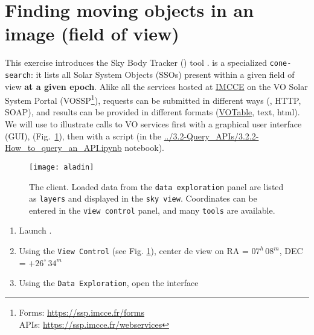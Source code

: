 \section{Finding moving objects in an image (field of view)}
\setcounter{questions}{1}


  This exercise introduces the Sky Body Tracker (\skybot) tool
  \citep{2006-ASPC-351-Berthier}.
  \skybot is a specialized \texttt{cone-search}: it lists
  all Solar System Objects (SSOs) present within
  a given field of view \textbf{at a given epoch}.
  Alike all the services hosted at
  \href{https://www.imcce.fr}{IMCCE}
  on the VO Solar System Portal
  (VOSSP\footnote{Forms: \href{https://ssp.imcce.fr/forms}{https://ssp.imcce.fr/forms}\\
  \hspace*{1.8em}APIs: \href{https://ssp.imcce.fr/webservices}{https://ssp.imcce.fr/webservices}}),
  \skybot requests
  can be submitted in different ways
  (\aladin, HTTP, SOAP), and results can be provided in different 
  formats (\href{https://www.ivoa.net/documents/VOTable/}{VOTable}, text, html).\\

  We will use \skybot to illustrate calls to VO services first with
  a graphical user interface (GUI), \aladin (Fig.~\ref{fig:aladin}), then 
  with a \python script (in the \url{../3.2-Query_APIs/3.2.2-How_to_query_an_API.ipynb} notebook).


\begin{figure}[ht]
  \centering
  \texttt{[image: aladin]}
  \caption{The \aladin client. Loaded data from the
  \texttt{data exploration} panel are listed as
  \texttt{layers} and displayed in the  
  \texttt{sky view}. Coordinates can be entered in the
  \texttt{view control} panel, and many
  \texttt{tools} are available.
  }
  \label{fig:aladin}
\end{figure}

\newpage
  \begin{enumerate}
    \setlength\itemsep{0em}
    \item Launch \aladin.
    \item Using the \texttt{View Control} (see Fig. \ref{fig:aladin}), center de view on 
          RA = $07^{h}\,08^{m}$, DEC = $+26^{\circ}\,34^{m}$ 
	\item Using the \texttt{Data Exploration}, open the \skybot interface 
  \end{enumerate}
  \setcounter{saveitem}{\value{enumi}}  

